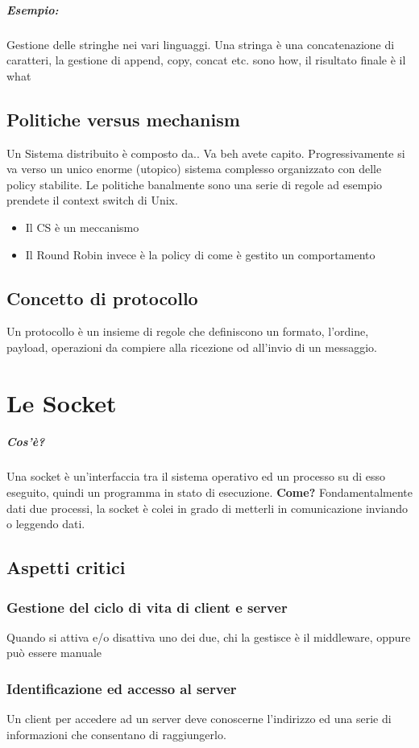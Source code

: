 \documentclass[12pt, a4paper, openany, twoside]{book}
\begin{document}
\paragraph{Esempio:}
Gestione delle stringhe nei vari linguaggi. Una stringa è una concatenazione
di caratteri, la gestione di append, copy, concat etc. sono how, il 
risultato finale è il what
\section{Politiche versus mechanism}
Un Sistema distribuito è composto da.. Va beh avete capito. Progressivamente
si va verso un unico enorme (utopico) sistema complesso organizzato con delle
policy stabilite. 
Le politiche banalmente sono una serie di regole ad esempio prendete il context
switch di Unix. 
\begin{itemize}
	\item Il CS è un meccanismo
	\item Il Round Robin invece è la policy di come è gestito un comportamento	
\end{itemize}
\section{Concetto di protocollo}
Un protocollo è un insieme di regole che definiscono un formato, l'ordine,
payload, operazioni da compiere alla ricezione od all'invio di un 
messaggio.
\chapter{Le Socket}
\paragraph{Cos'è?} Una socket è un'interfaccia tra il sistema operativo ed un 
processo su di esso eseguito, quindi un programma in stato di esecuzione.
\textbf{Come?} Fondamentalmente dati due processi, la socket è colei in grado di
metterli in comunicazione inviando o leggendo dati.
\section{Aspetti critici}
\subsection{Gestione del ciclo di vita di client e server}
Quando si attiva e/o disattiva uno dei due, chi la gestisce è il middleware, 
oppure può essere manuale
\subsection{Identificazione ed accesso al server}
Un client per accedere ad un server deve conoscerne l'indirizzo ed una serie di
informazioni che consentano di raggiungerlo.
\end{document}
